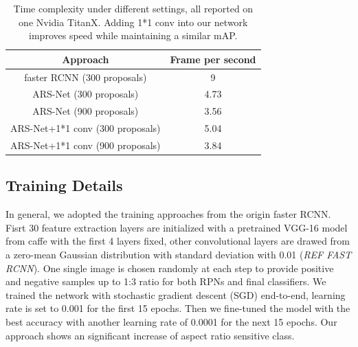 \documentclass[10pt,twocolumn,letterpaper]{article}
\begin{document}
\begin{table}[ht]
\centering
\begin{tabular}{|c|c|}
\hline Approach & Frame per second \\
\hline faster RCNN (300 proposals) & 9 \\
\hline ARS-Net (300 proposals) & 4.73 \\
\hline ARS-Net (900 proposals) & 3.56 \\
\hline ARS-Net+1*1 conv (300 proposals) & 5.04 \\
\hline ARS-Net+1*1 conv (900 proposals) & 3.84 \\
\hline
\end{tabular}
\caption{Time complexity under different settings, all reported on one Nvidia TitanX. Adding 1*1 conv into our network improves speed while maintaining a similar mAP.}
\label{table_fps}
\end{table}

\subsection{Training Details}
In general, we adopted the training approaches from the origin faster RCNN. Fisrt 30 feature extraction layers are initialized with a pretrained VGG-16 model from caffe with the first 4 layers fixed, other convolutional layers are drawed from a zero-mean Gaussian distribution with standard deviation with 0.01 (\emph{REF FAST RCNN}). One single image is chosen randomly at each step to provide positive and negative samples up to 1:3 ratio for both RPNs and final classifiers. We trained the network with stochastic gradient descent (SGD) end-to-end, learning rate is set to 0.001 for the first 15 epochs. Then we fine-tuned the model with the best accuracy with another learning rate of 0.0001 for the next 15 epochs. Our approach shows an significant increase of aspect ratio sensitive class.
\end{document}
